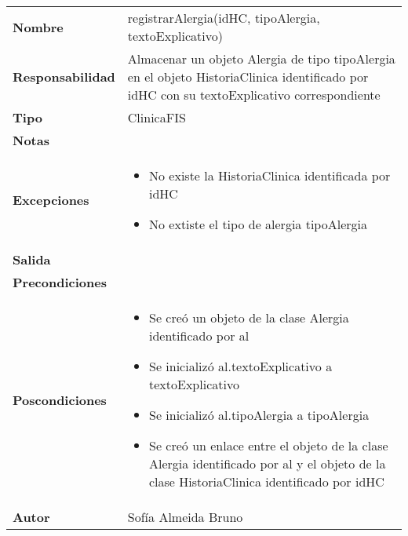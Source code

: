 \documentclass[11pt,a4paper]{article}
\newenvironment{itemizenomargins}
    {\begin{minipage}[t]{1\linewidth}\begin{itemize}}
    {\end{itemize}\end{minipage}}
\begin{document}
\begin{table}[H]
\centering
\label{my-label}
\begin{tabularx}{\textwidth}{l|X}
\textbf{Nombre}          & registrarAlergia(idHC, tipoAlergia, textoExplicativo) \\
\textbf{Responsabilidad} & Almacenar un objeto Alergia de tipo tipoAlergia en el objeto HistoriaClinica identificado por idHC con su textoExplicativo correspondiente\\
\textbf{Tipo}            & ClinicaFIS \\
\textbf{Notas}           &  \\
\textbf{Excepciones}     & 
\begin{itemizenomargins}
\item No existe la HistoriaClinica identificada por idHC
\item No extiste el tipo de alergia tipoAlergia
\end{itemizenomargins}\\
\textbf{Salida}          &  \\
\textbf{Precondiciones}  &  \\
\textbf{Poscondiciones}  &
\begin{itemizenomargins}
\item Se creó un objeto de la clase Alergia identificado por al
\item Se inicializó al.textoExplicativo a textoExplicativo
\item Se inicializó al.tipoAlergia a tipoAlergia
\item Se creó un enlace entre el objeto de la clase Alergia identificado por al y el objeto de la clase HistoriaClinica identificado por idHC
\end{itemizenomargins}\\
\textbf{Autor}           & Sofía Almeida Bruno
\end{tabularx}
\end{table}
\end{document}
